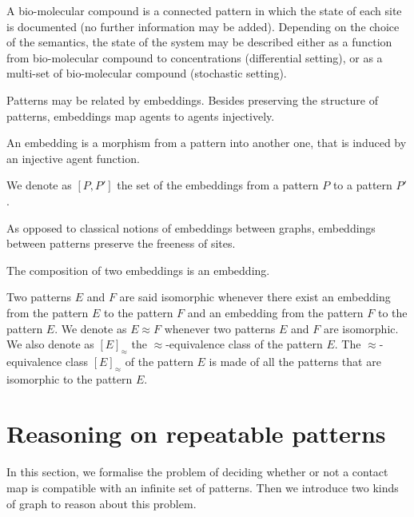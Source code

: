 \documentclass{entcs}
\newcommand{\iso}{\approx}
\newtheorem{myexample}[thm]{Example}
\begin{document}
A bio-molecular compound is a connected pattern in which the state of each site is documented (no further information may be added). Depending on the choice of the semantics, the state of the system may be described either as a function from bio-molecular compound to concentrations (differential setting), or as a multi-set of bio-molecular compound  (stochastic setting).

Patterns may be related by embeddings. Besides preserving the structure of patterns, embeddings map agents to agents injectively.

\begin{defn}[embeddings]
  An embedding is a morphism from a pattern into another one, that is induced by an injective agent function.

  We denote as $[P,P']$ the set of the embeddings from a pattern $P$ to a pattern $P'$.
\end{defn}


As opposed to classical notions of embeddings between graphs, embeddings between patterns preserve the freeness of sites.

The composition of two embeddings is an embedding.

Two patterns $E$ and $F$ are said isomorphic whenever there exist an embedding from the pattern $E$ to the pattern $F$ and an embedding from the pattern $F$ to the pattern $E$. We denote as $E \iso F$ whenever two patterns $E$ and $F$ are isomorphic. We also denote as $[E]_{\iso}$ the $\iso$-equivalence class of the pattern $E$. The $\iso$-equivalence class $[E]_{\iso}$ of the pattern $E$ is made of all the patterns that are isomorphic to the pattern $E$.

\section{Reasoning on repeatable patterns}
\label{sec:graphs}

In this section, we formalise the problem of deciding whether or not a contact map is compatible with an infinite set of patterns. Then we introduce two kinds of graph to reason about this problem.
\end{document}
